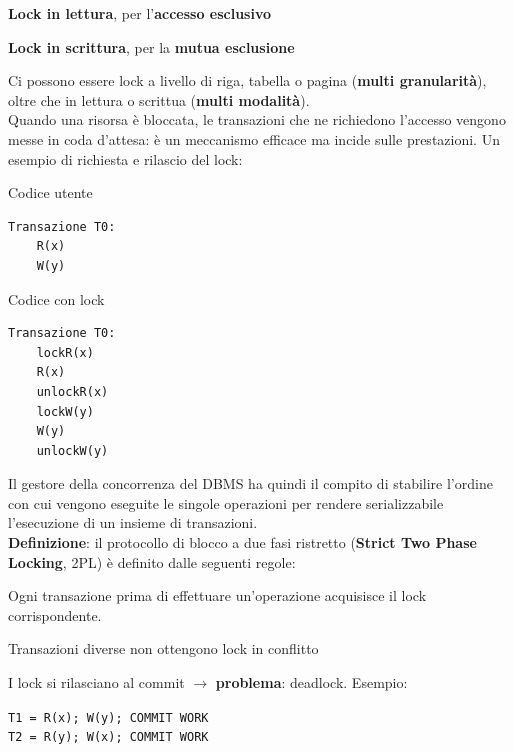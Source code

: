 \documentclass[10pt]{book}
\begin{document}
\begin{list}{}{}
\begin{list}{}{}
		\begin{list}{}{}
			\item \textbf{Lock in lettura}, per l'\textbf{accesso esclusivo}
			\item \textbf{Lock in scrittura}, per la \textbf{mutua esclusione}
		\end{list}
		Ci possono essere lock a livello di riga, tabella o pagina (\textbf{multi granularità}), oltre che in lettura o scrittua (\textbf{multi modalità}).\\
		Quando una risorsa è bloccata, le transazioni che ne richiedono l'accesso vengono messe in coda d'attesa: è un meccanismo efficace ma incide sulle prestazioni.
		Un esempio di richiesta e rilascio del lock:
		\begin{multicols}{2}
			Codice utente
			\begin{lstlisting}
Transazione T0:
	R(x)
	W(y)
			\end{lstlisting}
			\columnbreak
			Codice con lock
			\begin{lstlisting}
Transazione T0:
	lockR(x)
	R(x)
	unlockR(x)
	lockW(y)
	W(y)
	unlockW(y)
			\end{lstlisting}
		\end{multicols}
		Il gestore della concorrenza del DBMS ha quindi il compito di stabilire l'ordine con cui vengono eseguite le singole operazioni per rendere serializzabile l'esecuzione di un insieme di transazioni.\\
		\textbf{Definizione}: il protocollo di blocco a due fasi ristretto (\textbf{Strict Two Phase Locking}, 2PL) è definito dalle seguenti regole:
		\begin{list}{}{}
			\item Ogni transazione prima di effettuare un'operazione acquisisce il lock corrispondente.
			\item Transazioni diverse non ottengono lock in conflitto
			\item I lock si rilasciano al commit $\rightarrow$ \textbf{problema}: deadlock. Esempio:
			\begin{multicols}{2}
			\texttt{T1 = R(x); W(y); COMMIT WORK}\\
			\texttt{T2 = R(y); W(x); COMMIT WORK}
			\columnbreak
			

\end{multicols}
\end{list}
\end{list}
\end{list}
\end{document}
